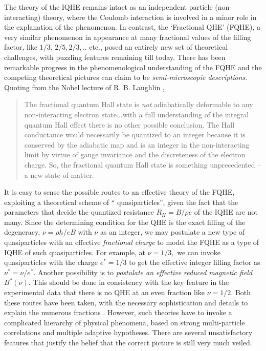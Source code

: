 \documentclass[aps,preprint,12pt,tightenlines]{revtex4}%
\begin{document}
The theory of the IQHE remains intact as an independent particle
(non-interacting) theory, where the Coulomb interaction is involved in a minor
role in the explanation of the phenomenon. In contrast, the `Fractional QHE'
(FQHE), a very similar phenomenon in appearance at many fractional values of
the filling factor, like $1/3$, $2/5,2/3,..$ etc., posed an entirely new set
of theoretical challenges, with puzzling features remaining till today. There
has been remarkable progress in the phenomenological understanding of the FQHE
and the competing theoretical pictures can claim to be \emph{semi-microscopic
descriptions}. Quoting from the Nobel lecture of R. B. Laughlin
\cite{Laughlin-Nobel},

\begin{quote}
The fractional quantum Hall state is \textit{not} adiabatically deformable to
any non-interacting electron state...with a full understanding of the integral
quantum Hall effect there is no other possible conclusion. The Hall
conductance would necessarily be quantized to an integer because it is
conserved by the adiabatic map and is an integer in the non-interacting limit
by virtue of gauge invariance and the discreteness of the electron charge. So,
the fractional quantum Hall state is something unprecedented -- a new state of matter.
\end{quote}

It is easy to sense the possible routes to an effective theory of the FQHE,
exploiting a theoretical scheme of \textquotedblleft
quasiparticles\textquotedblright, given the fact that the parameters that
decide the quantized resistance $R_{H}=B/\rho e$ of the IQHE are not many.
Since the determining condition for the QHE is the exact filling of the
degeneracy, $\nu=\rho h/eB$ with $\nu$ as an integer, we may postulate a new
type of quasiparticles with an effective \emph{fractional charge} to model the
FQHE as a type of IQHE of such quasiparticles. For example, at $\nu=1/3,$ we
can invoke quasiparticles with the charge $e^{\ast}=1/3$ to get the effective
integer filling factor as $\nu^{\ast}=\nu/e^{\ast}.$ Another possibility is to
\emph{postulate an effective reduced magnetic field }$B^{\ast}(\nu)$. This
should be done in consistency with the key feature in the experimental data
that there is no QHE at an even fraction like $\nu=1/2$. Both these routes
have been taken, with the necessary sophistication and details to explain the
numerous fractions \cite{FQHE-rev1,Girvin-SP}. However, such theories have to
invoke a complicated hierarchy of physical phenomena, based on strong
multi-particle correlations and multiple adaptive hypotheses. There are
several unsatisfactory features that justify the belief that the correct
picture is still very much veiled.
\end{document}
